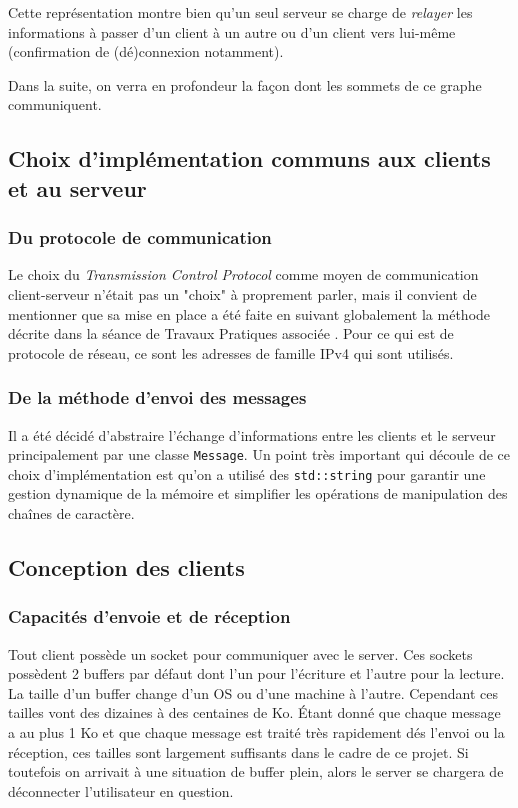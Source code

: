 \documentclass{article}
\begin{document}
\noindent Cette représentation montre bien qu'un seul serveur se charge de \textit{relayer} les informations à passer d'un client à un autre ou d'un client vers lui-même (confirmation de (dé)connexion notamment).

\noindent Dans la suite, on verra en profondeur la façon dont les sommets de ce graphe communiquent.

\subsection{Choix d'implémentation communs aux clients et au serveur}

\subsubsection{Du protocole de communication}
Le choix du \textit{Transmission Control Protocol} \cite{TCP-IP} comme moyen de communication client-serveur n'était pas un "choix" à proprement parler, mais il convient de mentionner que sa mise en place a été faite en suivant globalement la méthode décrite dans la séance de Travaux Pratiques associée \cite{TP_OS}. Pour ce qui est de protocole de réseau, ce sont les adresses de famille IPv4 qui sont utilisés.

\subsubsection{De la méthode d'envoi des messages}
\noindent Il a été décidé d'abstraire l'échange d'informations entre les clients et le serveur principalement par une classe \texttt{Message}. Un point très important qui découle de ce choix d'implémentation est qu'on a utilisé des \texttt{std::string} \cite{std::string} pour garantir une gestion dynamique de la mémoire et simplifier les opérations de manipulation des chaînes de caractère.

\subsection{Conception des clients}

\subsubsection{Capacités d'envoie et de réception}
 Tout client possède un socket pour communiquer avec le server. Ces sockets possèdent 2 buffers par défaut dont l'un pour l'écriture et l'autre pour la lecture. La taille d'un buffer change d'un OS ou d'une machine à l'autre. Cependant ces tailles vont des dizaines à des centaines de Ko. Étant donné que chaque message a au plus 1 Ko et que chaque message est traité très rapidement dés l'envoi ou la réception, ces tailles sont largement suffisants dans le cadre de ce projet. Si toutefois on arrivait à une situation de buffer plein, alors le server se chargera de déconnecter l'utilisateur en question.
\end{document}
